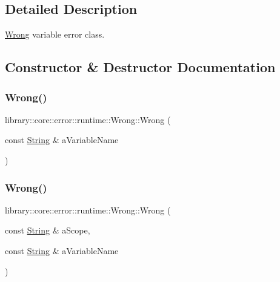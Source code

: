 \subsection{Detailed Description}
\hyperlink{classlibrary_1_1core_1_1error_1_1runtime_1_1Wrong}{Wrong} variable error class. 

\subsection{Constructor \& Destructor Documentation}
\mbox{\label{classlibrary_1_1core_1_1error_1_1runtime_1_1Wrong_acb341a0822b64bfa2d8cdf7963b24f96}} 
\subsubsection{\texorpdfstring{Wrong()}{Wrong()}\hspace{0.1cm}{\footnotesize\ttfamily [1/2]}}
{\footnotesize\ttfamily library\+::core\+::error\+::runtime\+::\+Wrong\+::\+Wrong (\begin{DoxyParamCaption}\item[{const \hyperlink{classlibrary_1_1core_1_1types_1_1String}{String} \&}]{a\+Variable\+Name }\end{DoxyParamCaption})}

\mbox{\label{classlibrary_1_1core_1_1error_1_1runtime_1_1Wrong_a413ec4868a4a3283cc0a1dcd2882ad1e}} 
\subsubsection{\texorpdfstring{Wrong()}{Wrong()}\hspace{0.1cm}{\footnotesize\ttfamily [2/2]}}
{\footnotesize\ttfamily library\+::core\+::error\+::runtime\+::\+Wrong\+::\+Wrong (\begin{DoxyParamCaption}\item[{const \hyperlink{classlibrary_1_1core_1_1types_1_1String}{String} \&}]{a\+Scope,  }\item[{const \hyperlink{classlibrary_1_1core_1_1types_1_1String}{String} \&}]{a\+Variable\+Name }\end{DoxyParamCaption})}

